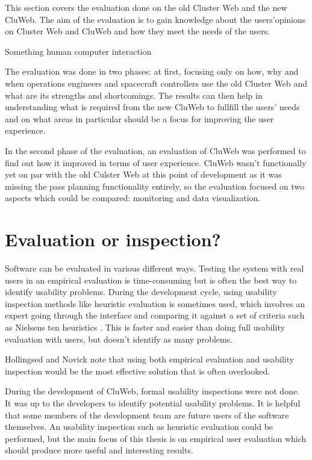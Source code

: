 
This section covers the evaluation done on the old Cluster Web and the new CluWeb. The aim of the evaluation is to gain knowledge about the users'opinions on Cluster Web and CluWeb and how they meet the needs of the users.

Something human computer interaction \cite{4839639}

The evaluation was done in two phases: at first, focusing only on how, why and when operations engineers and spacecraft controllers use the old Cluster Web and what are its strengths and shortcomings. The results can then help in understanding what is required from the new CluWeb to fullfill the users' needs and on what areas in particular should be a focus for improving the user experience.

In the second phase of the evaluation, an evaluation of CluWeb was performed to find out how it improved in terms of user experience. CluWeb wasn't functionally yet on par with the old Culster Web at this point of development as it was missing the pass planning functionality entirely, so the evaluation focused on two aspects which could be compared: monitoring and data visualization.

\section{Evaluation or inspection?}
Software can be evaluated in various different ways. Testing the system with real users in an empirical evaluation is time-consuming but is often the best way to identify usability problems. During the development cycle, using usability inspection methods like heuristic evaluation is sometimes used, which involves an expert going through the interface and comparing it against a set of criteria such as Nielsens ten heuristics \cite{nielsen2005ten, nielsen1995usability}. This is faster and easier than doing full usability evaluation with users, but doesn't identify as many problems.

Hollingsed and Novick note that using both empirical evaluation and usability inspection would be the most effective solution that is often overlooked. \cite{hollingsed2007usability}

During the development of CluWeb, formal usability inspections were not done. It was up to the developers to identify potential usability problems. It is helpful that some members of the development team are future users of the software themselves. An usability inspection such as heuristic evaluation could be performed, but the main focus of this thesis is on empirical user evaluation which should produce more useful and interesting results.

